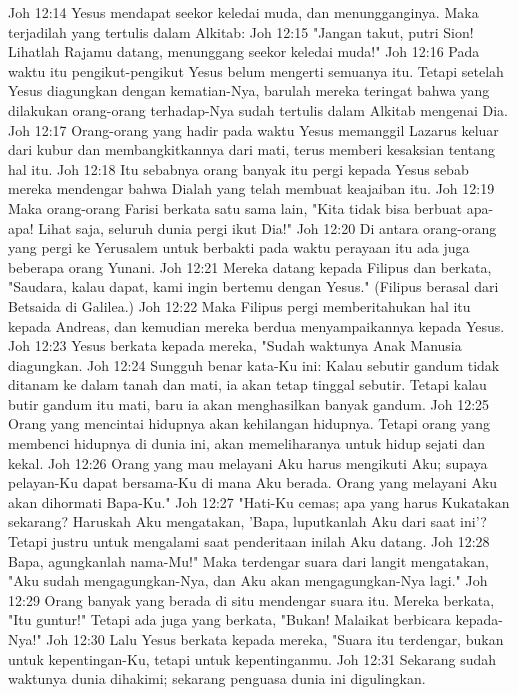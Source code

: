 Joh 12:14  Yesus mendapat seekor keledai muda, dan menungganginya. Maka terjadilah yang tertulis dalam Alkitab:
Joh 12:15  "Jangan takut, putri Sion! Lihatlah Rajamu datang, menunggang seekor keledai muda!"
Joh 12:16  Pada waktu itu pengikut-pengikut Yesus belum mengerti semuanya itu. Tetapi setelah Yesus diagungkan dengan kematian-Nya, barulah mereka teringat bahwa yang dilakukan orang-orang terhadap-Nya sudah tertulis dalam Alkitab mengenai Dia.
Joh 12:17  Orang-orang yang hadir pada waktu Yesus memanggil Lazarus keluar dari kubur dan membangkitkannya dari mati, terus memberi kesaksian tentang hal itu.
Joh 12:18  Itu sebabnya orang banyak itu pergi kepada Yesus sebab mereka mendengar bahwa Dialah yang telah membuat keajaiban itu.
Joh 12:19  Maka orang-orang Farisi berkata satu sama lain, "Kita tidak bisa berbuat apa-apa! Lihat saja, seluruh dunia pergi ikut Dia!"
Joh 12:20  Di antara orang-orang yang pergi ke Yerusalem untuk berbakti pada waktu perayaan itu ada juga beberapa orang Yunani.
Joh 12:21  Mereka datang kepada Filipus dan berkata, "Saudara, kalau dapat, kami ingin bertemu dengan Yesus." (Filipus berasal dari Betsaida di Galilea.)
Joh 12:22  Maka Filipus pergi memberitahukan hal itu kepada Andreas, dan kemudian mereka berdua menyampaikannya kepada Yesus.
Joh 12:23  Yesus berkata kepada mereka, "Sudah waktunya Anak Manusia diagungkan.
Joh 12:24  Sungguh benar kata-Ku ini: Kalau sebutir gandum tidak ditanam ke dalam tanah dan mati, ia akan tetap tinggal sebutir. Tetapi kalau butir gandum itu mati, baru ia akan menghasilkan banyak gandum.
Joh 12:25  Orang yang mencintai hidupnya akan kehilangan hidupnya. Tetapi orang yang membenci hidupnya di dunia ini, akan memeliharanya untuk hidup sejati dan kekal.
Joh 12:26  Orang yang mau melayani Aku harus mengikuti Aku; supaya pelayan-Ku dapat bersama-Ku di mana Aku berada. Orang yang melayani Aku akan dihormati Bapa-Ku."
Joh 12:27  "Hati-Ku cemas; apa yang harus Kukatakan sekarang? Haruskah Aku mengatakan, 'Bapa, luputkanlah Aku dari saat ini'? Tetapi justru untuk mengalami saat penderitaan inilah Aku datang.
Joh 12:28  Bapa, agungkanlah nama-Mu!" Maka terdengar suara dari langit mengatakan, "Aku sudah mengagungkan-Nya, dan Aku akan mengagungkan-Nya lagi."
Joh 12:29  Orang banyak yang berada di situ mendengar suara itu. Mereka berkata, "Itu guntur!" Tetapi ada juga yang berkata, "Bukan! Malaikat berbicara kepada-Nya!"
Joh 12:30  Lalu Yesus berkata kepada mereka, "Suara itu terdengar, bukan untuk kepentingan-Ku, tetapi untuk kepentinganmu.
Joh 12:31  Sekarang sudah waktunya dunia dihakimi; sekarang penguasa dunia ini digulingkan.
